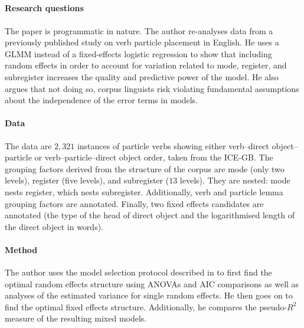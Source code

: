 \documentclass[a4paper,12pt]{article}
\begin{document}
\begin{mdframed}

  \subsection*{\citet{Gries2015}}

  \paragraph{Research questions}
  
  The paper is programmatic in nature.
  The author re-analyses data from a previously published study on verb particle placement in English.
  He uses a GLMM instead of a fixed-effects logistic regression to show that including random effects in order to account for variation related to mode, register, and subregister increases the quality and predictive power of the model.
  He also argues that not doing so, corpus linguists risk violating fundamental assumptions about the independence of the error terms in models.
  
  \paragraph{Data}
  
  The data are $2,321$ instances of particle verbs showing either verb--direct object--particle or verb--particle--direct object order, taken from the ICE-GB.
  The grouping factors derived from the structure of the corpus are mode (only two levels), register (five levels), and subregister ($13$ levels).
  They are nested: mode nests register, which nests subregister.
  Additionally, verb and particle lemma grouping factors are annotated.
  Finally, two fixed effects candidates are annotated (the type of the head of direct object and the logarithmised length of the direct object in words).
  
  \paragraph{Method}
  
  The author uses the model selection protocol described in \citet{ZuurEa2009} to first find the optimal random effects structure using ANOVAs and AIC comparisons as well as analyses of the estimated variance for single random effects.
  He then goes on to find the optimal fixed effects structure.
  Additionally, he compares the pseudo-$R^2$ measure of the resulting mixed models.
  

\end{mdframed}
\end{document}
